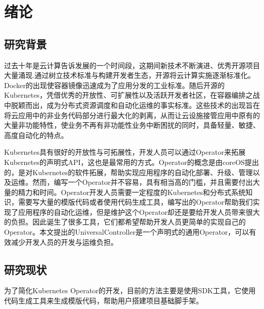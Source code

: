 \documentclass[macfonts,master]{njuthesis}
\begin{document}
\listoffigures

\listoftables

\mainmatter

\chapter{绪论}\label{chapter_introduction}
\section{研究背景}

过去十年是云计算告诉发展的一个时间段，这期间新技术不断演进、优秀开源项目大量涌现.通过树立技术标准与构建开发者生态，开源将云计算实施逐渐标准化。Docker的出现使容器镜像迅速成为了应用分发的工业标准。随后开源的Kubernetes，凭借优秀的开放性、可扩展性以及活跃开发者社区，在容器编排之战中脱颖而出，成为分布式资源调度和自动化运维的事实标准。这些技术的出现旨在将云应用中的非业务代码部分进行最大化的剥离，从而让云设施接管应用中原有的大量非功能特性，使业务不再有非功能性业务中断困扰的同时，具备轻量、敏捷、高度自动化的特点。

Kubernetes具有很好的开放性与可拓展性，开发人员可以通过Operator来拓展Kubernetes的声明式API，这也是最常用的方式。Operator的概念是由coreOS提出的，是对Kubernetes的软件拓展，帮助实现应用程序的自动化部署、升级、管理以及运维。然而，编写一个Operator并不容易，具有相当高的门槛，并且需要付出大量的精力和时间。Operator开发人员需要一定程度的Kubernetes和分布式系统知识，需要写大量的模版代码或者使用代码生成工具，编写出的Operator帮助我们实现了应用程序的自动化运维，但是维护这个Operator却还是要给开发人员带来很大的负担。因此诞生了很多工具，它们都希望帮助开发人员更简单的实现自己的Operator。本文提出的UniversalController是一个声明式的通用Operator，可以有效减少开发人员的开发与运维负担。

\section{研究现状}
为了简化Kubernetes Operator的开发，目前的方法主要是使用SDK工具，它使用代码生成工具来生成模版代码，帮助用户搭建项目基础脚手架。
\end{document}
